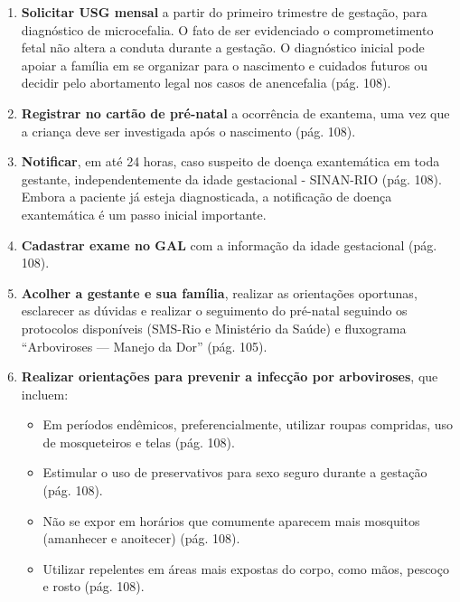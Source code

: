 \documentclass[conference,a4paper]{IEEEtran}
\begin{document}
\begin{enumerate}
  \item \textbf{Solicitar USG mensal} a partir do primeiro
        trimestre de gestação, para diagnóstico de microcefalia.
        O fato de ser evidenciado o comprometimento fetal não
        altera a conduta durante a gestação. O diagnóstico
        inicial pode apoiar a família em se organizar para o
        nascimento e cuidados futuros ou decidir pelo abortamento
        legal nos casos de anencefalia (pág. 108).
  \item \textbf{Registrar no cartão de pré-natal} a ocorrência de
        exantema, uma vez que a criança deve ser investigada após
        o nascimento (pág. 108).
  \item \textbf{Notificar}, em até 24 horas, caso suspeito de
        doença exantemática em toda gestante, independentemente
        da idade gestacional - SINAN-RIO (pág. 108). Embora a
        paciente já esteja diagnosticada, a notificação de doença
        exantemática é um passo inicial importante.
  \item \textbf{Cadastrar exame no GAL} com a informação da idade
        gestacional (pág. 108).
  \item \textbf{Acolher a gestante e sua família}, realizar as
        orientações oportunas, esclarecer as dúvidas e realizar o
        seguimento do pré-natal seguindo os protocolos
        disponíveis (SMS-Rio e Ministério da Saúde) e fluxograma
        ``Arboviroses --- Manejo da Dor'' (pág. 105).
  \item \textbf{Realizar orientações para prevenir a infecção por
        arboviroses}, que incluem:
  \begin{itemize}
    \item Em períodos endêmicos, preferencialmente, utilizar
          roupas compridas, uso de mosqueteiros e telas
          (pág. 108).
    \item Estimular o uso de preservativos para sexo seguro
          durante a gestação (pág. 108).
    \item Não se expor em horários que comumente aparecem mais
          mosquitos (amanhecer e anoitecer) (pág. 108).
    \item Utilizar repelentes em áreas mais expostas do corpo,
          como mãos, pescoço e rosto (pág. 108).
  \end{itemize}
\end{enumerate}
\end{document}

